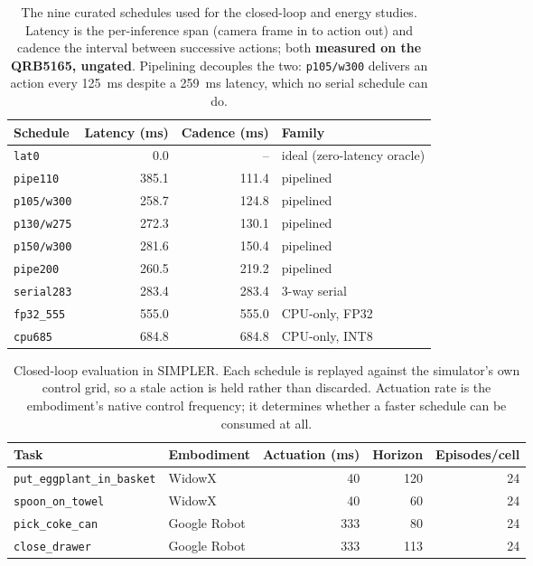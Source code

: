 \begin{table}[t]
\centering
\caption{The nine curated schedules used for the closed-loop and energy
studies.  Latency is the per-inference span (camera frame in to action out)
and cadence the interval between successive actions; both \textbf{measured on
the QRB5165, ungated}.  Pipelining decouples the two: \texttt{p105/w300}
delivers an action every \SI{125}{\milli\second} despite a
\SI{259}{\milli\second} latency, which no serial schedule can do.}
\label{tab:arms}
\small
\begin{tabular}{lrrl}
\toprule
Schedule & Latency (\si{\milli\second}) & Cadence (\si{\milli\second}) & Family \\
\midrule
\texttt{lat0}       &   0.0 &     -- & ideal (zero-latency oracle) \\
\texttt{pipe110}    & 385.1 &  111.4 & pipelined \\
\texttt{p105/w300}  & 258.7 &  124.8 & pipelined \\
\texttt{p130/w275}  & 272.3 &  130.1 & pipelined \\
\texttt{p150/w300}  & 281.6 &  150.4 & pipelined \\
\texttt{pipe200}    & 260.5 &  219.2 & pipelined \\
\texttt{serial283}  & 283.4 &  283.4 & 3-way serial \\
\texttt{fp32\_555}  & 555.0 &  555.0 & CPU-only, FP32 \\
\texttt{cpu685}     & 684.8 &  684.8 & CPU-only, INT8 \\
\bottomrule
\end{tabular}
\end{table}

\begin{table}[t]
\centering
\caption{Closed-loop evaluation in SIMPLER.  Each schedule is replayed against
the simulator's own control grid, so a stale action is held rather than
discarded.  Actuation rate is the embodiment's native control frequency; it
determines whether a faster schedule can be consumed at all.}
\label{tab:tasks}
\small
\begin{tabular}{llrrr}
\toprule
Task & Embodiment & Actuation (\si{\milli\second}) & Horizon & Episodes/cell \\
\midrule
\texttt{put\_eggplant\_in\_basket} & WidowX       &  40 & 120 & 24 \\
\texttt{spoon\_on\_towel}          & WidowX       &  40 &  60 & 24 \\
\texttt{pick\_coke\_can}           & Google Robot & 333 &  80 & 24 \\
\texttt{close\_drawer}             & Google Robot & 333 & 113 & 24 \\
\bottomrule
\end{tabular}
\end{table}
